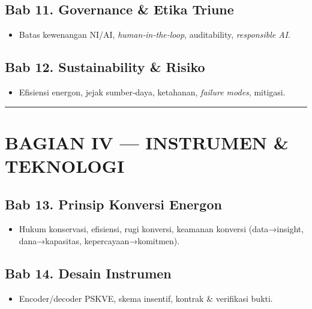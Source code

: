 \documentclass[
  letterpaper,
  DIV=11,
  numbers=noendperiod]{scrartcl}
\providecommand{\tightlist}{%
  \setlength{\itemsep}{0pt}\setlength{\parskip}{0pt}}
\begin{document}
\subsection{Bab 11. Governance \& Etika
Triune}\label{bab-11.-governance-etika-triune}

\begin{itemize}
\tightlist
\item
  Batas kewenangan NI/AI, \emph{human‑in‑the‑loop}, auditability,
  \emph{responsible AI}.
\end{itemize}

\subsection{Bab 12. Sustainability \&
Risiko}\label{bab-12.-sustainability-risiko}

\begin{itemize}
\tightlist
\item
  Efisiensi energon, jejak sumber‑daya, ketahanan, \emph{failure modes},
  mitigasi.
\end{itemize}

\begin{center}\rule{0.5\linewidth}{0.5pt}\end{center}

\section{BAGIAN IV --- INSTRUMEN \&
TEKNOLOGI}\label{bagian-iv-instrumen-teknologi}

\subsection{Bab 13. Prinsip Konversi
Energon}\label{bab-13.-prinsip-konversi-energon}

\begin{itemize}
\tightlist
\item
  Hukum konservasi, efisiensi, rugi konversi, keamanan konversi
  (data→insight, dana→kapasitas, kepercayaan→komitmen).
\end{itemize}

\subsection{Bab 14. Desain Instrumen}\label{bab-14.-desain-instrumen}

\begin{itemize}
\tightlist
\item
  Encoder/decoder PSKVE, skema insentif, kontrak \& verifikasi bukti.
\end{itemize}
\end{document}
